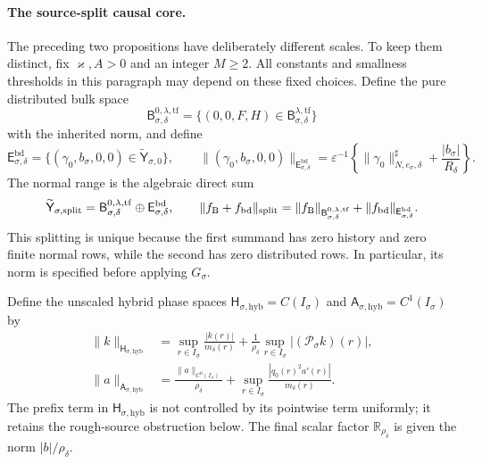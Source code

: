 \paragraph{The source-split causal core.}
The preceding two propositions have deliberately different scales.  To keep
them distinct, fix \(\varkappa,A>0\) and an integer \(M\ge2\).  All constants
and smallness thresholds in this paragraph may depend on these fixed choices.
Define the pure distributed bulk space
\begin{equation}
 \mathsf B_{\sigma,\delta}^{0,\lambda,\mathrm{tf}}
 =\{(0,0,F,H)\in
       \mathsf B_{\sigma,\delta}^{\lambda,\mathrm{tf}}\}     \label{eq:source-split-pure-bulk}
\end{equation}
with the inherited norm, and define
\begin{equation}
 \mathsf E_{\sigma,\delta}^{\mathrm{bd}}
 =\{(\gamma_0,b_\sigma,0,0)
       \in\widetilde{\mathsf Y}_{\sigma,0}\},\qquad
 \|(\gamma_0,b_\sigma,0,0)\|_{\mathsf E_{\sigma,\delta}^{\mathrm{bd}}}
 =\varepsilon^{-1}\left\{
   \|\gamma_0\|_{N,e_\sigma,\delta}^{\sharp}
       +\frac{|b_\sigma|}{R_\delta}\right\}.       \label{eq:source-split-boundary-space}
\end{equation}
The normal range is the algebraic direct sum
\begin{equation}
 \widetilde{\mathsf Y}_{\sigma,\mathrm{split}}
 =\mathsf B_{\sigma,\delta}^{0,\lambda,\mathrm{tf}}
       \oplus\mathsf E_{\sigma,\delta}^{\mathrm{bd}},
 \qquad
 \|f_{\rm B}+f_{\rm bd}\|_{\mathrm{split}}
 =\|f_{\rm B}\|_{\mathsf B_{\sigma,\delta}^{0,\lambda,\mathrm{tf}}}
   +\|f_{\rm bd}\|_{\mathsf E_{\sigma,\delta}^{\mathrm{bd}}}. \label{eq:source-split-normal-range}
\end{equation}
This splitting is unique because the first summand has zero history and zero
finite normal rows, while the second has zero distributed rows.  In
particular, its norm is specified before applying \(G_\sigma\).

Define the unscaled hybrid phase spaces
\(
 \mathsf H_{\sigma,\mathrm{hyb}}=C(I_\sigma)
\)
and
\(
 \mathsf A_{\sigma,\mathrm{hyb}}=C^1(I_\sigma)
\)
by
\begin{align}
 \|k\|_{\mathsf H_{\sigma,\mathrm{hyb}}}
 &=\sup_{r\in I_\sigma}\frac{|k(r)|}{m_\delta(r)}
   +\frac1{\rho_\delta}
       \sup_{r\in I_\sigma}|(\mathcal P_\sigma k)(r)|,
                                                        \label{eq:source-split-hybrid-H}\\
 \|a\|_{\mathsf A_{\sigma,\mathrm{hyb}}}
 &=\frac{\|a\|_{C^0(I_\sigma)}}{\rho_\delta}
   +\sup_{r\in I_\sigma}
       \frac{|q_0(r)^2a'(r)|}{m_\delta(r)}.        \label{eq:source-split-hybrid-A}
\end{align}
The prefix term in \(\mathsf H_{\sigma,\mathrm{hyb}}\) is not controlled by
its pointwise term uniformly; it retains the rough-source obstruction below.
The final scalar factor \(\mathbb R_{\rho_\delta}\) is given the norm
\(|b|/\rho_\delta\).

